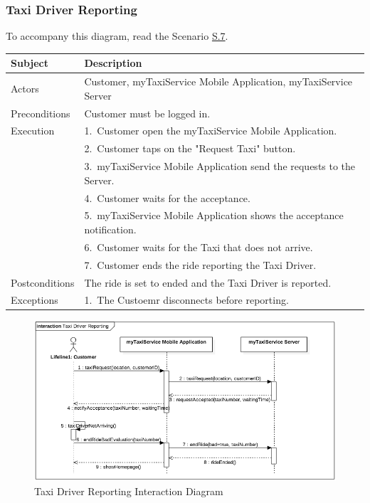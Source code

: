 \subsubsection{Taxi Driver Reporting}
			To accompany this diagram, read the Scenario \hyperref[sec:TaxiDriverReportingScenario]{S.7}.

				\begin{table}[htpb]
					\centering
					\label{tab:TaxiDriverReportingDiagramTable}
					\begin{tabularx}{\textwidth}{lp{9cm}}
						\hline
						\hline
							\textbf{Subject}
						& 
							\textbf{Description}\\
						\hline
							Actors	       &  Customer, myTaxiService Mobile Application, myTaxiService Server\\
						\hline
							Preconditions  &  Customer must be logged in.\\
						\hline
							Execution      &  1.~Customer open the myTaxiService Mobile Application.\\
										   &  2.~Customer taps on the "Request Taxi" button.\\
										   &  3.~myTaxiService Mobile Application send the requests to the Server.\\
										   &  4.~Customer waits for the acceptance.\\
										   &  5.~myTaxiService Mobile Application shows the acceptance notification.\\
										   &  6.~Customer waits for the Taxi that does not arrive.\\
										   &  7.~Customer ends the ride reporting the Taxi Driver.\\
						\hline
							Postconditions &  The ride is set to ended and the Taxi Driver is reported.\\
						\hline
							Exceptions     &  1.~The Custoemr disconnects before reporting.\\
									
						\hline
						\hline
					\end{tabularx}
				\end{table}
				
				\begin{figure}[H]
					\centering
					\includegraphics[width=\textwidth, scale=0.5]{IMG/InteractionDiagrams/TaxiDriverReporting.png}
					\caption{Taxi Driver Reporting Interaction Diagram}\label{sec:FigureTaxiDriverReporting}
				\end{figure}